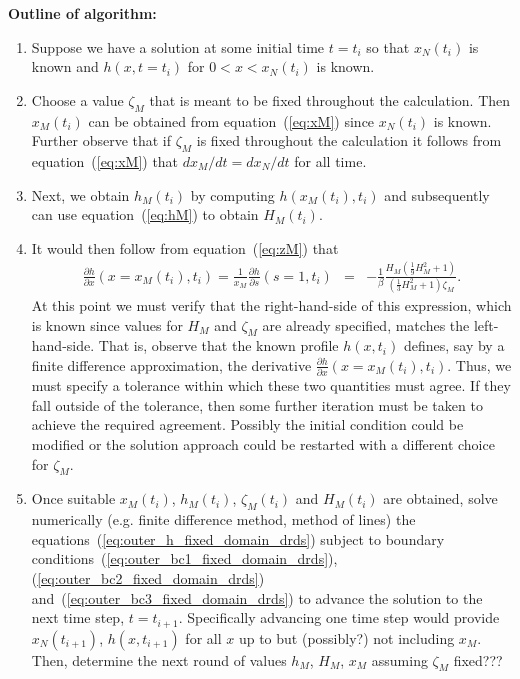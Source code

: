 \documentclass[11pt]{article}
\newcommand{\bea}{\begin{eqnarray}}
\newcommand{\eea}{\end{eqnarray}}
\begin{document}
{\bf Outline of algorithm: {\color{red}{DMA still thinking about some of these ideas ...}}}
\begin{enumerate}
\item Suppose we have a solution at some initial time $t=t_i$ so that $x_N(t_i)$ is known and $h(x,t=t_i)$ for $0 < x < x_N(t_i)$ is known.  
%
\item Choose a value $\zeta_M$ that is meant to be fixed throughout the calculation.   Then $x_M(t_i)$ can be obtained from equation~(\ref{eq:xM}) since $x_N(t_i)$ is known.  Further
observe that if $\zeta_M$ is fixed throughout the calculation it follows from equation~(\ref{eq:xM}) that $d x_M/dt = d x_N/dt$ for all time.
%
\item Next, we obtain $h_M(t_i)$ by computing $h(x_M(t_i),t_i)$ and subsequently can use equation~(\ref{eq:hM}) to obtain $H_M(t_i)$.
%
\item It would then follow from equation~(\ref{eq:zM}) that
\bea
\frac{\partial h}{\partial x}(x=x_M(t_i),t_i)  = \frac{1}{x_M} \frac{\partial h}{\partial s}(s=1,t_i)& = & - \frac{1}{\beta} \frac{H_M \left( \frac{1}{9} H_M^2 + 1 \right) }{ \left( \frac{1}{3} H_M^2 + 1 \right) \zeta_M }.
\eea
At this point we must verify that the right-hand-side of this expression, which is known since values for $H_M$ and $\zeta_M$ are already specified, matches the left-hand-side.
That is, observe that the known profile $h(x,t_i)$ defines, say by a finite difference approximation, the derivative $\frac{\partial h}{\partial x}(x=x_M(t_i),t_i)$.  Thus, we
must specify a tolerance within which these two quantities must agree.  If they fall outside of the tolerance, then some further iteration must be taken to 
achieve the required agreement.   Possibly the initial condition could be modified or the solution approach could be restarted with a different choice for $\zeta_M$.
%
\item Once suitable $x_M(t_i)$, $h_M(t_i)$, $\zeta_M(t_i)$ and $H_M(t_i)$ are obtained, solve numerically (e.g. finite difference method, method of lines) the equations~(\ref{eq:outer_h_fixed_domain_drds}) 
subject to boundary conditions~(\ref{eq:outer_bc1_fixed_domain_drds}), (\ref{eq:outer_bc2_fixed_domain_drds}) and~(\ref{eq:outer_bc3_fixed_domain_drds}) to advance the solution to the next time step, $t=t_{i+1}$. Specifically advancing one time step would provide $x_N(t_{i+1})$, $h(x,t_{i+1})$ for all $x$ up to but (possibly?) not including $x_M$.  Then,
determine the next round of values $h_M$, $H_M$, $x_M$ assuming $\zeta_M$ fixed???
\end{enumerate}
\end{document}
